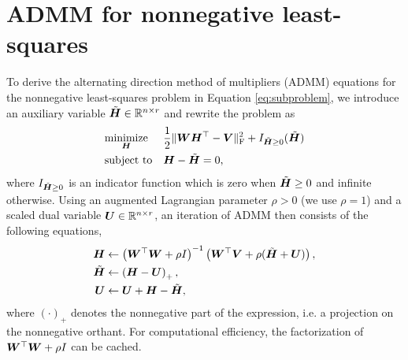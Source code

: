 \documentclass{article}
\begin{document}
\section{ADMM for nonnegative least-squares}\label{sec:ADMM}
To derive the alternating direction method of multipliers (ADMM) equations for the nonnegative least-squares problem in Equation \ref{eq:subproblem}, we introduce an auxiliary variable $\tilde{{\bm{H}}}\in\mathbb{R}^{n\times r}$ and rewrite the problem as
\begin{equation}
    \begin{aligned}
        & \underset{{\bm{H}}}{\text{minimize}}
        & & \frac{1}{2}\|{\bm{W}}{\bm{H}}^\top   - {\bm{V}}\|_\text{F}^2 + I_{\tilde{{\bm{H}}}\geq 0}(\tilde{{\bm{H}}}) \\
        & \text{subject to} & & {\bm{H}} - \tilde{{\bm{H}}} = 0,
    \end{aligned}
\end{equation}
where $I_{\tilde{{\bm{H}}}\geq 0}$ is an indicator function which is zero when $\tilde{{\bm{H}}}\geq 0$ and infinite otherwise. Using an augmented Lagrangian parameter $\rho> 0$ (we use $\rho=1$) and a scaled dual variable ${\bm{U}}\in\mathbb{R}^{n\times r}$, an iteration of ADMM then consists of the following equations,
\begin{align}
    {\bm{H}}&\gets \left({\bm{W}}^\top{\bm{W}} + \rho I\right)^{-1}\left({\bm{W}}^\top {\bm{V}} + \rho (\tilde{{\bm{H}}} + {\bm{U}}) \right),\\
    \tilde{{\bm{H}}} &\gets \left({\bm{H}} - {\bm{U}}\right)_+,\\
    {\bm{U}} &\gets {\bm{U}} + {\bm{H}}-\tilde{{\bm{H}}},
\end{align}
where $(\cdot)_+$ denotes the nonnegative part of the expression, i.e. a projection on the nonnegative orthant. For computational efficiency, the factorization of ${\bm{W}}^\top{\bm{W}} + \rho I $ can be cached.
\end{document}
